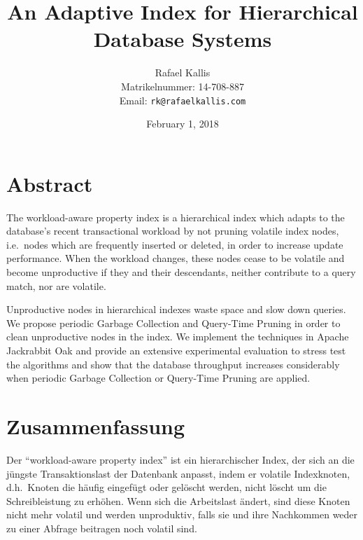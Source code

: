 \documentclass[abstracton,12pt]{scrartcl}
\title{An Adaptive Index for Hierarchical Database Systems}
\author{
    Rafael Kallis\\[-5pt]
    \scriptsize Matrikelnummer: 14-708-887\\[-5pt]
    \scriptsize Email: \texttt{rk@rafaelkallis.com}
}
\date{\vspace*{2cm}February 1, 2018}
\theoremstyle{definition}
\begin{document}
\maketitle
\thispagestyle{empty}


\newpage
\thispagestyle{empty}
\vspace*{7cm}

\section*{Abstract}

The workload-aware property index is a hierarchical index which adapts to the
database's recent transactional workload by not pruning volatile index nodes,
i.e.\ nodes which are frequently inserted or deleted, in order to increase
update performance. When the workload changes, these nodes cease to be volatile
and become unproductive if they and their descendants, neither contribute to a
query match, nor are volatile.

Unproductive nodes in hierarchical indexes waste space and slow down queries.
We propose periodic Garbage Collection and Query-Time Pruning in order to
clean unproductive nodes in the index. We implement the techniques in Apache
Jackrabbit Oak and
provide an extensive experimental evaluation to stress test the algorithms and
show that the database throughput increases considerably when periodic Garbage
Collection or Query-Time Pruning are applied.

\newpage
\thispagestyle{empty}
\vspace*{7cm}

\section*{Zusammenfassung}

Der ``workload-aware property index'' ist ein hierarchischer Index, der sich an
die jüngste Transaktionslast der Datenbank anpasst, indem er volatile
Indexknoten, d.h.\ Knoten die häufig eingefügt oder gelöscht werden, nicht löscht
um die Schreibleistung zu erhöhen. Wenn sich die Arbeitslast ändert, sind
diese Knoten nicht mehr volatil und werden unproduktiv, falls sie und ihre
Nachkommen weder zu einer Abfrage beitragen noch volatil sind.
\end{document}
